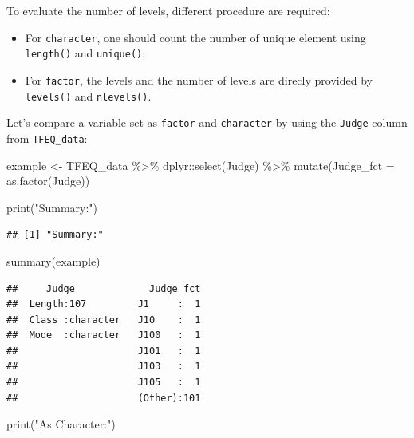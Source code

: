 \documentclass[
]{book}
\newenvironment{Shaded}{\begin{snugshade}}{\end{snugshade}}
\newcommand{\AttributeTok}[1]{\textcolor[rgb]{0.77,0.63,0.00}{#1}}
\newcommand{\FunctionTok}[1]{\textcolor[rgb]{0.00,0.00,0.00}{#1}}
\newcommand{\NormalTok}[1]{#1}
\newcommand{\OtherTok}[1]{\textcolor[rgb]{0.56,0.35,0.01}{#1}}
\newcommand{\SpecialCharTok}[1]{\textcolor[rgb]{0.00,0.00,0.00}{#1}}
\newcommand{\StringTok}[1]{\textcolor[rgb]{0.31,0.60,0.02}{#1}}
\providecommand{\tightlist}{%
  \setlength{\itemsep}{0pt}\setlength{\parskip}{0pt}}
\begin{document}
To evaluate the number of levels, different procedure are required:

\begin{itemize}
\tightlist
\item
  For \texttt{character}, one should count the number of unique element using \texttt{length()} and \texttt{unique()};
\item
  For \texttt{factor}, the levels and the number of levels are direcly provided by \texttt{levels()} and \texttt{nlevels()}.
\end{itemize}

Let's compare a variable set as \texttt{factor} and \texttt{character} by using the \texttt{Judge} column from \texttt{TFEQ\_data}:

\begin{Shaded}
\begin{Highlighting}[]
\NormalTok{example }\OtherTok{\textless{}{-}}\NormalTok{ TFEQ\_data }\SpecialCharTok{\%\textgreater{}\%} 
\NormalTok{  dplyr}\SpecialCharTok{::}\FunctionTok{select}\NormalTok{(Judge) }\SpecialCharTok{\%\textgreater{}\%} 
  \FunctionTok{mutate}\NormalTok{(}\AttributeTok{Judge\_fct =} \FunctionTok{as.factor}\NormalTok{(Judge))}

\FunctionTok{print}\NormalTok{(}\StringTok{"Summary:"}\NormalTok{)}
\end{Highlighting}
\end{Shaded}

\begin{verbatim}
## [1] "Summary:"
\end{verbatim}

\begin{Shaded}
\begin{Highlighting}[]
\FunctionTok{summary}\NormalTok{(example)}
\end{Highlighting}
\end{Shaded}

\begin{verbatim}
##     Judge             Judge_fct  
##  Length:107         J1     :  1  
##  Class :character   J10    :  1  
##  Mode  :character   J100   :  1  
##                     J101   :  1  
##                     J103   :  1  
##                     J105   :  1  
##                     (Other):101
\end{verbatim}

\begin{Shaded}
\begin{Highlighting}[]
\FunctionTok{print}\NormalTok{(}\StringTok{"As Character:"}\NormalTok{)}
\end{Highlighting}
\end{Shaded}
\end{document}
